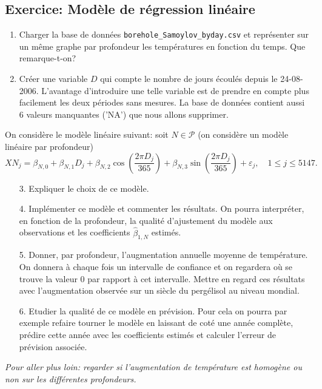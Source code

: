 \documentclass[a4paper,12pt]{article}
\theoremstyle{exercice}
\begin{document}
\newpage

\subsection*{Exercice: Modèle de régression linéaire}

\begin{enumerate}
\item Charger la base de données  \texttt{borehole\_Samoylov\_byday.csv} et représenter sur un même graphe par profondeur les  températures en fonction du temps. Que remarque-t-on?
\item
Créer une variable $D$ qui compte le nombre de jours écoulés depuis le 24-08-2006. L'avantage d'introduire une telle variable est de prendre en compte plus facilement les deux périodes sans mesures. La base de données contient aussi 6 valeurs manquantes ('NA') que nous allons supprimer.\end{enumerate}


On considère le modèle linéaire suivant: soit  $N\in \mathcal P$ (on considère un modèle linéaire par profondeur)
$$ XN_{j} = \beta_{N,0}+\beta_{N,1} D_{j}+\beta_{N,2}\cos\left(\frac{2\pi D_{j}}{365}\right)+\beta_{N,3}\sin\left(\frac{2\pi D_{j}}{365}\right)+\varepsilon_{j},\quad 1\le j\le 5147.$$
\begin{enumerate}\item[3.] Expliquer le choix de ce modèle. 
\item[4.] Implémenter ce modèle et commenter les résultats. On pourra interpréter, en fonction de la profondeur, la qualité d'ajustement du modèle aux observations et  les coefficients $\hat \beta_{1,N}$ estimés. 
\item[5.]  Donner, par profondeur, l'augmentation annuelle moyenne de température. On donnera à chaque fois un intervalle de confiance et on regardera où se trouve la valeur 0 par rapport à cet intervalle.  Mettre en regard ces résultats avec l'augmentation observée sur un siècle du pergélisol au niveau mondial.
\item[6.]  Etudier la qualité de ce modèle en prévision. Pour cela on pourra par exemple refaire tourner le modèle en laissant de coté une année complète, prédire cette année avec les coefficients estimés et calculer l'erreur de prévision associée.
\end{enumerate}

\textit{Pour aller plus loin: regarder si l'augmentation de température est homogène ou non sur les différentes profondeurs.}
\end{document}
